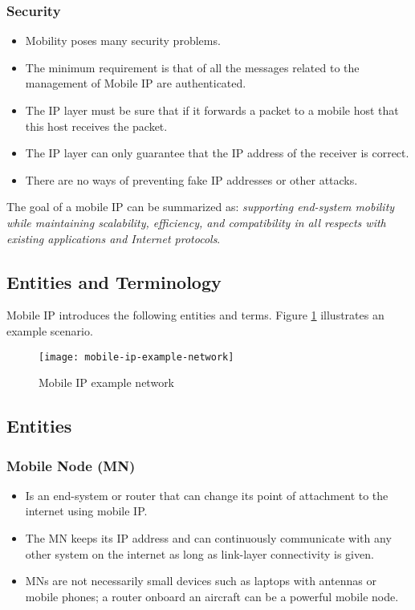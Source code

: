\subsubsection{Security}
\begin{itemize}
	\item Mobility poses many security problems.
	\item The minimum requirement is that of all the messages related to the management of Mobile IP are authenticated. 
	\item The IP layer must be sure that if it forwards a packet to a mobile host that this host receives the packet.
	\item The IP layer can only guarantee that the IP address of the receiver is correct.
	\item There are no ways of preventing fake IP addresses or other attacks.
\end{itemize}


The goal of a mobile IP can be summarized as: \emph{supporting end-system mobility while maintaining scalability, efficiency, and compatibility in all respects with existing applications and Internet protocols}.


\subsection{Entities and Terminology}
Mobile IP introduces the following entities and terms. Figure \ref{fig:mobile_ip_example}
illustrates an example scenario.


\begin{figure}[ht!]
	\centering
	\texttt{[image: mobile-ip-example-network]}
	\caption{Mobile IP example network}\label{fig:mobile_ip_example}
\end{figure}


\subsection*{Entities}

\subsubsection[Mobile Node]{Mobile Node (MN)}
\begin{itemize}
	\item Is an end-system or router that can change its point of attachment to the internet using mobile IP. 
	\item The MN keeps its IP address and can continuously communicate with any other system on the internet as long as link-layer connectivity is given.
	\item MNs are not necessarily small devices such as laptops with antennas or mobile phones; a router onboard an aircraft can be a powerful mobile node.
\end{itemize}

